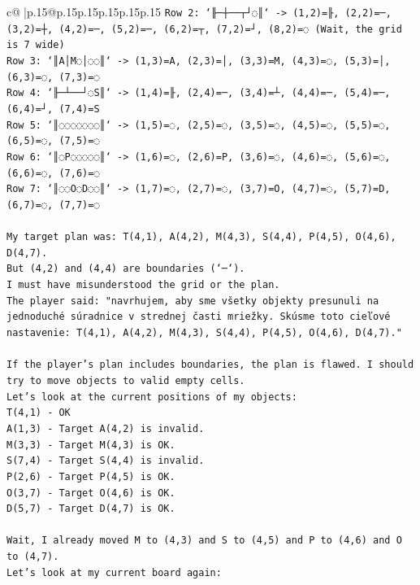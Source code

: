 \documentclass{article}
\begin{document}
{\begin{supertabular}{c@{$\;$}|p{.15\linewidth}@{}p{.15\linewidth}p{.15\linewidth}p{.15\linewidth}p{.15\linewidth}p{.15\linewidth}}
{{{\texttt{Row 2: `╟─┼──┬┘◌║` {-}> (1,2)=╟, (2,2)=─, (3,2)=┼, (4,2)=─, (5,2)=─, (6,2)=┬, (7,2)=┘, (8,2)=◌ (Wait, the grid is 7 wide)} \\
\texttt{Row 3: `║A│M◌│◌◌║` {-}> (1,3)=A, (2,3)=│, (3,3)=M, (4,3)=◌, (5,3)=│, (6,3)=◌, (7,3)=◌} \\
\texttt{Row 4: `╟─┴──┘◌S║` {-}> (1,4)=╟, (2,4)=─, (3,4)=┴, (4,4)=─, (5,4)=─, (6,4)=┘, (7,4)=S} \\
\texttt{Row 5: `║◌◌◌◌◌◌◌║` {-}> (1,5)=◌, (2,5)=◌, (3,5)=◌, (4,5)=◌, (5,5)=◌, (6,5)=◌, (7,5)=◌} \\
\texttt{Row 6: `║◌P◌◌◌◌◌║` {-}> (1,6)=◌, (2,6)=P, (3,6)=◌, (4,6)=◌, (5,6)=◌, (6,6)=◌, (7,6)=◌} \\
\texttt{Row 7: `║◌◌O◌D◌◌║` {-}> (1,7)=◌, (2,7)=◌, (3,7)=O, (4,7)=◌, (5,7)=D, (6,7)=◌, (7,7)=◌} \\
\\ 
\texttt{My target plan was: T(4,1), A(4,2), M(4,3), S(4,4), P(4,5), O(4,6), D(4,7).} \\
\texttt{But (4,2) and (4,4) are boundaries (`─`).} \\
\texttt{I must have misunderstood the grid or the plan.} \\
\texttt{The player said: "navrhujem, aby sme všetky objekty presunuli na jednoduché súradnice v strednej časti mriežky. Skúsme toto cieľové nastavenie: T(4,1), A(4,2), M(4,3), S(4,4), P(4,5), O(4,6), D(4,7)."} \\
\\ 
\texttt{If the player's plan includes boundaries, the plan is flawed. I should try to move objects to valid empty cells.} \\
\texttt{Let's look at the current positions of my objects:} \\
\texttt{T(4,1) {-} OK} \\
\texttt{A(1,3) {-} Target A(4,2) is invalid.} \\
\texttt{M(3,3) {-} Target M(4,3) is OK.} \\
\texttt{S(7,4) {-} Target S(4,4) is invalid.} \\
\texttt{P(2,6) {-} Target P(4,5) is OK.} \\
\texttt{O(3,7) {-} Target O(4,6) is OK.} \\
\texttt{D(5,7) {-} Target D(4,7) is OK.} \\
\\ 
\texttt{Wait, I already moved M to (4,3) and S to (4,5) and P to (4,6) and O to (4,7).} \\
\texttt{Let's look at my current board again:} \\
}}}
\end{supertabular}}
\end{document}
